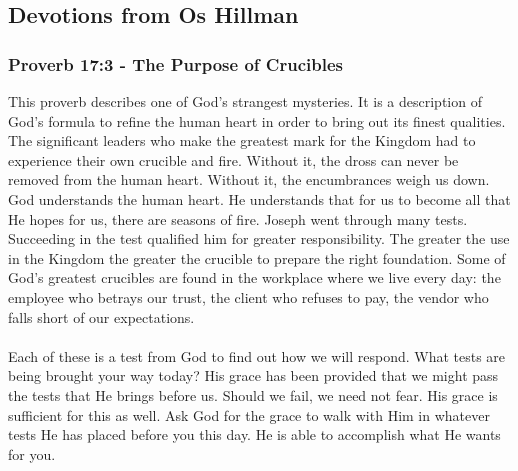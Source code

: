 \subsection{Devotions from Os Hillman}


\subsubsection{Proverb 17:3 - The Purpose of Crucibles}


This proverb describes one of God’s strangest mysteries. It is a description of God’s
formula to refine the human heart in order to bring out its finest qualities. The
significant leaders who make the greatest mark for the Kingdom had to experience
their own crucible and fire. Without it, the dross can never be removed from the
human heart. Without it, the encumbrances weigh us down. God understands the
human heart. He understands that for us to become all that He hopes for us, there
are seasons of fire. Joseph went through many tests. Succeeding in the test qualified
him for greater responsibility. The greater the use in the Kingdom the greater the
crucible to prepare the right foundation. Some of God’s greatest crucibles are found
in the workplace where we live every day: the employee who betrays our trust, the
client who refuses to pay, the vendor who falls short of our expectations.\\
\\
\noindent Each of these is a test from God to find out how we will respond. What tests
are being brought your way today? His grace has been provided that we might pass the tests that He brings before us. Should we fail, we need not fear. His grace is
sufficient for this as well. Ask God for the grace to walk with Him in whatever tests
He has placed before you this day. He is able to accomplish what He wants for you.



